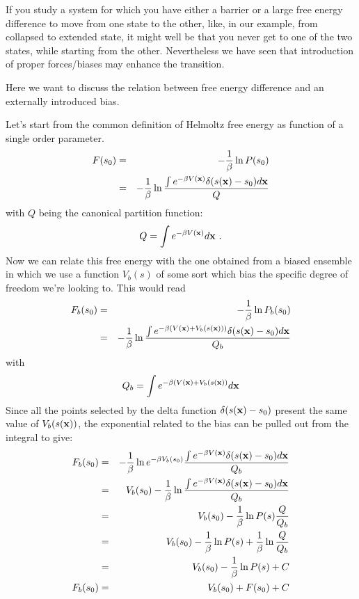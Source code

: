 \documentclass[10pt,fleqn,a4paper]{report}
\begin{document}
If you study a system for which you have either a barrier or a large free energy difference to move from one state to the other, like, in our example, from collapsed to extended state, 
it might well be that you never get to one of the two states, while starting from the other. 
Nevertheless we have seen that introduction of proper forces/biases may enhance the transition. 

Here we want to discuss the relation between free energy difference and an externally introduced bias.

Let's start from the common definition of Helmoltz free energy as function of a single order parameter.
\begin{eqnarray}
F(s_0)&=&-\frac{1}{\beta} \ln P(s_0)\\
 &=&-\frac{1}{\beta} \ln \frac{\int e^{-\beta V({\bf x})} \delta(s({\bf x})-s_0) d{\bf x}}{Q}
\end{eqnarray}
with $Q$ being the canonical partition function:
\begin{equation}
Q=\int e^{-\beta V({\bf x})}  d{\bf x} \ .
\end{equation}
Now we can relate this free energy with the one obtained from a biased ensemble in which we use 
a function $V_b(s)$ of some sort which bias the specific degree of freedom we're looking to. This would read
\begin{eqnarray}
F_b(s_0)&=&-\frac{1}{\beta} \ln P_b(s_0)\\
 &=&-\frac{1}{\beta} \ln \frac{\int e^{-\beta (V({\bf x})+V_b(s({\bf x})))} \delta(s({\bf x})-s_0) d{\bf x}}{Q_b}
\end{eqnarray}
with 
\begin{eqnarray}
Q_b=\int e^{-\beta (V({\bf x})+V_b(s({\bf x}))}  d{\bf x} 
\end{eqnarray}
Since all the points selected by the delta function $\delta(s({\bf x})-s_0)$ present the same value of $V_b(s({\bf x}))$, the exponential related to the bias can be pulled out from the integral to give:
 \begin{eqnarray}
F_b(s_0)&=&-\frac{1}{\beta} \ln e^{-\beta V_b(s_0)}\frac{\int e^{-\beta V({\bf x})} \delta(s({\bf x})-s_0) d{\bf x}}{Q_b}\\
&=&V_b(s_0)-\frac{1}{\beta} \ln \frac{\int e^{-\beta V({\bf x})} \delta(s({\bf x})-s_0) d{\bf x}}{Q_b}\\
&=&V_b(s_0)-\frac{1}{\beta} \ln P(s)\frac{Q}{Q_b}\\
&=&V_b(s_0)-\frac{1}{\beta} \ln P(s)+\frac{1}{\beta} \ln \frac{Q}{Q_b}\\
&=&V_b(s_0)-\frac{1}{\beta} \ln P(s)+C\\
F_b(s_0)&=&V_b(s_0)+F(s_0)+C
\end{eqnarray}
\end{document}
